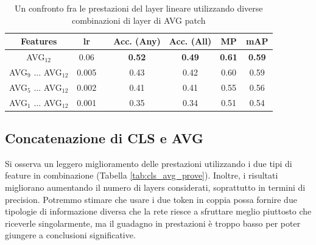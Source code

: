 \begin{table}[h]
    \centering
    \setlength{\tabcolsep}{5pt} %
    \renewcommand{\arraystretch}{1.6} %
    \begin{tabular}{c|c|ccccc}
        \hline
         Features & lr & & \textbf{Acc. (Any)} & \textbf{Acc. (All)} & \textbf{MP} & \textbf{mAP} \\
         \hline
         AVG$_{12}$               & 0.06   & & \textbf{0.52} & \textbf{0.49} & \textbf{0.61} & \textbf{0.59} \\
         AVG$_{9}$ ... AVG$_{12}$ & 0.005  & & 0.43 & 0.42 & 0.60 & 0.59 \\
         AVG$_{5}$ ... AVG$_{12}$ & 0.002  & & 0.41 & 0.41 & 0.55 & 0.56 \\
         AVG$_{1}$ ... AVG$_{12}$ & 0.001 & & 0.35 & 0.34 & 0.51 & 0.54 \\
         \hline
    \end{tabular}
    \caption{Un confronto fra le prestazioni del layer lineare utilizzando diverse combinazioni di layer di AVG patch}
    \label{tab:avg_prove}
\end{table}



\subsection{Concatenazione di CLS e AVG}
Si osserva un leggero miglioramento delle prestazioni utilizzando i due tipi di feature in combinazione (Tabella \ref{tab:cls_avg_prove}). Inoltre, i risultati migliorano aumentando il numero di layers considerati, soprattutto in termini di precision. Potremmo stimare che usare i due token in coppia possa fornire due tipologie di informazione diversa che la rete riesce a sfruttare meglio piuttosto che riceverle singolarmente, ma il guadagno in prestazioni è troppo basso per poter giungere a conclusioni significative. 

